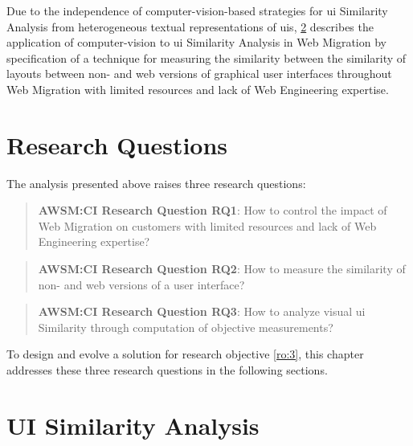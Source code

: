 Due to the independence of computer-vision-based strategies for  \gls{ui} Similarity Analysis from heterogeneous textual representations of \glspl{ui}, \cref{sec:visual-analysis} describes the application of computer-vision to \gls{ui} Similarity Analysis in \gls{Web Migration} by specification of a technique for measuring the similarity between the similarity of layouts between  non- and \gls{web} versions of graphical user interfaces throughout \gls{Web Migration} with limited resources and lack of \gls{Web Engineering} expertise.

\hypertarget{sec:ci.research-questions}{%
\section{Research Questions}\label{sec:ci.research-questions}}
\vspace{15pt}

The analysis presented above raises three research questions:

\begin{quote}
\textbf{AWSM:CI Research Question RQ1}: How to control the impact of \gls{Web Migration} on customers with limited resources and lack of \gls{Web Engineering} expertise?
\end{quote}

\begin{quote}
\textbf{AWSM:CI Research Question RQ2}: How to measure the similarity of non- and \gls{web} versions of a user
interface?
\end{quote}

\begin{quote}
\textbf{AWSM:CI Research Question RQ3}: How to analyze visual \gls{ui} Similarity through computation of objective measurements?
\end{quote}

To design and evolve a solution for research objective \cref{ro:3}, this chapter addresses these three research questions in the following sections.

\vspace{-15pt}
\hypertarget{sec:visual-analysis}{%
\section{UI Similarity Analysis}\label{sec:visual-analysis}}
\vspace{15pt}

